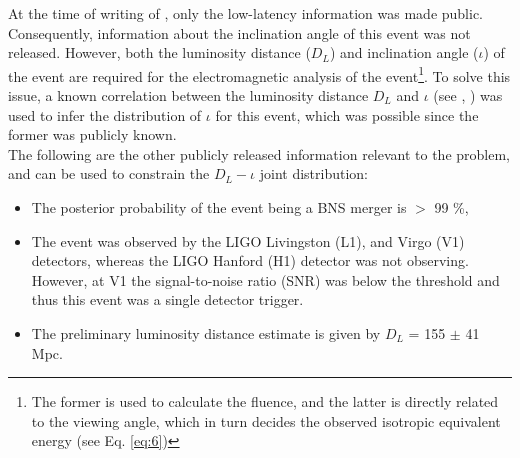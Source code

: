     At the time of writing of \cite{saleem_2020b}, only the low-latency information was
    made public. Consequently, information about the inclination angle of this event was
    not released. However, both the luminosity distance ($D_L$) and inclination angle
    ($\iota$) of the event are required for the electromagnetic analysis of the
    event\footnote{
        The former is used to calculate the fluence, and the latter is directly related
        to the viewing angle, which in turn decides the observed isotropic equivalent
        energy (see Eq. \ref{eq:6})
    }. To solve this issue, a known correlation between the luminosity distance $D_L$
    and $\iota$ (see \cite{schutz_2011}, \cite{seto_2015}) was used to infer the
    distribution of $\iota$ for this event, which was possible since the former was
    publicly known.\\
    The following are the other publicly released information relevant to the problem,
    and can be used to constrain the $D_L-\iota$ joint distribution:
    \begin{itemize}

        \item The posterior probability of the event being a BNS merger is $>$ 99 \%,

        \item The event was observed by the LIGO Livingston (L1), and Virgo (V1)
            detectors, whereas the LIGO Hanford (H1) detector was not observing.
            However, at V1 the signal-to-noise ratio (SNR) was below the threshold and
            thus this event was a single detector trigger.

        \item The preliminary luminosity distance estimate is given by $D_L$ = 155 $\pm$
            41 Mpc.

    \end{itemize}

